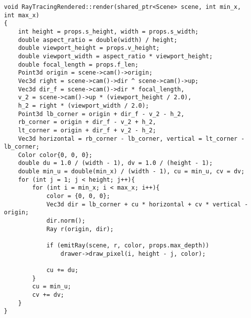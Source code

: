 \newpage

\begin{center}
    \captionsetup{justification=raggedright,singlelinecheck=off}
    \begin{lstlisting}[label=lst:trace,caption=Трассировка лучей]
void RayTracingRendered::render(shared_ptr<Scene> scene, int min_x, int max_x)
{
	int height = props.s_height, width = props.s_width;
	double aspect_ratio = double(width) / height;
	double viewport_height = props.v_height;
	double viewport_width = aspect_ratio * viewport_height;
	double focal_length = props.f_len;
	Point3d origin = scene->cam()->origin;
	Vec3d right = scene->cam()->dir ^ scene->cam()->up;
	Vec3d dir_f = scene->cam()->dir * focal_length,
	v_2 = scene->cam()->up * (viewport_height / 2.0),
	h_2 = right * (viewport_width / 2.0);
	Point3d lb_corner = origin + dir_f - v_2 - h_2,
	rb_corner = origin + dir_f - v_2 + h_2,
	lt_corner = origin + dir_f + v_2 - h_2;
	Vec3d horizontal = rb_corner - lb_corner, vertical = lt_corner - lb_corner;
	Color color{0, 0, 0};
	double du = 1.0 / (width - 1), dv = 1.0 / (height - 1);
	double min_u = double(min_x) / (width - 1), cu = min_u, cv = dv;
	for (int j = 1; j < height; j++){
		for (int i = min_x; i < max_x; i++){
			color = {0, 0, 0};
			Vec3d dir = lb_corner + cu * horizontal + cv * vertical - origin;
			dir.norm();
			Ray r(origin, dir);
			
			if (emitRay(scene, r, color, props.max_depth))
				drawer->draw_pixel(i, height - j, color);
			
			cu += du;
		}
		cu = min_u;
		cv += dv;
	}
}
\end{lstlisting}
\end{center}

\newpage

